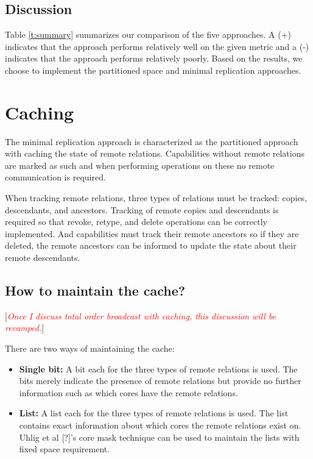 \documentclass[a4paper,twoside]{report} %
\newcommand{\note}[1]{[\textcolor{red}{\textit{#1}}]}
\begin{document}
\subsection{Discussion}
Table \ref{t:summary} summarizes our comparison of the five
approaches. A (+) indicates that the approach performs relatively well
on the given metric and a (-) indicates that the approach performs
relatively poorly. Based on the results, we choose to implement the
partitioned space and minimal replication approaches.

\section{Caching}\label{sec:cache}
The minimal replication approach is characterized as the partitioned
approach with caching the state of remote relations. Capabilities
without remote relations are marked as such and when performing
operations on these no remote communication is required.

When tracking remote relations, three types of relations must be
tracked: copies, descendants, and ancestors. Tracking of remote copies
and descendants is required so that revoke, retype, and delete
operations can be correctly implemented. And capabilities must track
their remote ancestors so if they are deleted, the remote ancestors
can be informed to update the state about their remote descendants.

\subsection{How to maintain the cache?}

\note{Once I discuss total order broadcast with caching, this
  discussion will be revamped.}

There are two ways of maintaining the cache:
\begin{itemize}
\item \textbf{Single bit:} A bit each for the three types of remote
  relations is used. The bits merely indicate the presence of remote
  relations but provide no further information such as which cores
  have the remote relations.

\item \textbf{List:} A list each for the three types of remote
  relations is used. The list contains exact information about which
  cores the remote relations exist on. Uhlig et al [?]'s core mask
  technique can be used to maintain the lists with fixed space
  requirement.
\end{itemize}
\end{document}
